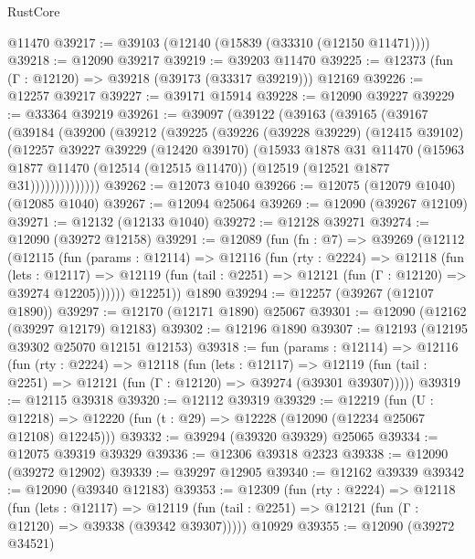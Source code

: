 \begin{lexlean}{RustCore}
\begin{coremodule}
    @11470
@39217 := @39103 (@12140 (@15839 (@33310 (@12150 @11471))))
@39218 := @12090 @39217
@39219 := @39203 @11470
@39225 := @12373 (fun (Γ : @12120) => @39218 (@39173 (@33317 @39219))) @12169
@39226 := @12257 @39217
@39227 := @39171 @15914
@39228 := @12090 @39227
@39229 := @33364 @39219
@39261 := @39097
    (@39122
      (@39163
        (@39165
          (@39167
            (@39184
              (@39200
                (@39212
                  (@39225
                    (@39226
                      (@39228 @39229)
                      (@12415 @39102)
                      (@12257
                        @39227
                        @39229
                        (@12420 @39170)
                        (@15933
                          @1878
                          @31
                          @11470
                          (@15963
                            @1877
                            @11470
                            (@12514 (@12515 @11470))
                            (@12519 (@12521 @1877 @31))))))))))))))
@39262 := @12073 @1040
@39266 := @12075 (@12079 @1040) (@12085 @1040)
@39267 := @12094 @25064
@39269 := @12090 (@39267 @12109)
@39271 := @12132 (@12133 @1040)
@39272 := @12128 @39271
@39274 := @12090 (@39272 @12158)
@39291 := @12089
    (fun (fn : @7) =>
    @39269
      (@12112
        (@12115
          (fun (params : @12114) =>
          @12116
            (fun (rty : @2224) =>
            @12118
              (fun (lets : @12117) =>
              @12119 (fun (tail : @2251) => @12121 (fun (Γ : @12120) => @39274 @12205))))))
        @12251))
    @1890
@39294 := @12257 (@39267 (@12107 @1890))
@39297 := @12170 (@12171 @1890) @25067
@39301 := @12090 (@12162 (@39297 @12179) @12183)
@39302 := @12196 @1890
@39307 := @12193 (@12195 @39302 @25070 @12151 @12153)
@39318 := fun (params : @12114) =>
  @12116
    (fun (rty : @2224) =>
    @12118
      (fun (lets : @12117) =>
      @12119 (fun (tail : @2251) => @12121 (fun (Γ : @12120) => @39274 (@39301 @39307)))))
@39319 := @12115 @39318
@39320 := @12112 @39319
@39329 := @12219
    (fun (U : @12218) => @12220 (fun (t : @29) => @12228 (@12090 (@12234 @25067 @12108) @12245)))
@39332 := @39294 (@39320 @39329) @25065
@39334 := @12075 @39319 @39329
@39336 := @12306 @39318 @2323
@39338 := @12090 (@39272 @12902)
@39339 := @39297 @12905
@39340 := @12162 @39339
@39342 := @12090 (@39340 @12183)
@39353 := @12309
    (fun (rty : @2224) =>
    @12118
      (fun (lets : @12117) =>
      @12119 (fun (tail : @2251) => @12121 (fun (Γ : @12120) => @39338 (@39342 @39307)))))
    @10929
@39355 := @12090 (@39272 @34521)

\end{coremodule}
\end{lexlean}
